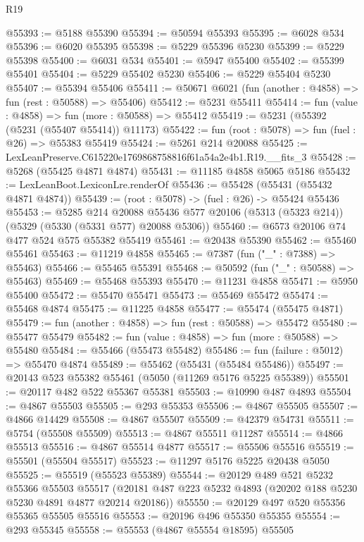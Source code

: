 \begin{lexlean}{R19}
\begin{coremodule}
@55393 := @5188 @55390
@55394 := @50594 @55393
@55395 := @6028 @534
@55396 := @6020 @55395
@55398 := @5229 @55396 @5230
@55399 := @5229 @55398
@55400 := @6031 @534
@55401 := @5947 @55400
@55402 := @55399 @55401
@55404 := @5229 @55402 @5230
@55406 := @5229 @55404 @5230
@55407 := @55394 @55406
@55411 := @50671 @6021 (fun (another : @4858) => fun (rest : @50588) => @55406)
@55412 := @5231 @55411
@55414 := fun (value : @4858) => fun (more : @50588) => @55412
@55419 := @5231 (@55392 (@5231 (@55407 @55414)) @11173)
@55422 := fun (root : @5078) => fun (fuel : @26) => @55383 @55419
@55424 := @5261 @214 @20088
@55425 := LexLeanPreserve.C615220e1769868758816f61a54a2e4b1.R19.__fits_3
@55428 := @5268 (@55425 @4871 @4874)
@55431 := @11185 @4858 @5065 @5186
@55432 := LexLeanBoot.LexiconLre.renderOf
@55436 := @55428 (@55431 (@55432 @4871 @4874))
@55439 := (root : @5078) -> (fuel : @26) -> @55424 @55436
@55453 := @5285
    @214
    @20088
    @55436
    @577
    @20106
    (@5313 (@5323 @214))
    (@5329 (@5330 (@5331 @577) @20088 @5306))
@55460 := @6573 @20106 @74 @477 @524 @575 @55382 @55419
@55461 := @20438 @55390
@55462 := @55460 @55461
@55463 := @11219 @4858
@55465 := @7387 (fun ("_" : @7388) => @55463)
@55466 := @55465 @55391
@55468 := @50592 (fun ("_" : @50588) => @55463)
@55469 := @55468 @55393
@55470 := @11231 @4858
@55471 := @5950 @55400
@55472 := @55470 @55471
@55473 := @55469 @55472
@55474 := @55468 @4874
@55475 := @11225 @4858
@55477 := @55474 (@55475 @4871)
@55479 := fun (another : @4858) => fun (rest : @50588) => @55472
@55480 := @55477 @55479
@55482 := fun (value : @4858) => fun (more : @50588) => @55480
@55484 := @55466 (@55473 @55482)
@55486 := fun (failure : @5012) => @55470 @4874
@55489 := @55462 (@55431 (@55484 @55486))
@55497 := @20143 @523 @55382 @55461 (@5050 (@11269 @5176 @5225 @55389))
@55501 := @20117 @482 @522 @55367 @55381
@55503 := @10990 @487 @4893
@55504 := @4867 @55503
@55505 := @293 @55353
@55506 := @4867 @55505
@55507 := @4866 @14429
@55508 := @4867 @55507
@55509 := @42379 @54731
@55511 := @5754 (@55508 @55509)
@55513 := @4867 @55511 @11287
@55514 := @4866 @55513
@55516 := @4867 @55514 @4877
@55517 := @55506 @55516
@55519 := @55501 (@55504 @55517)
@55523 := @11297 @5176 @5225 @20438 @5050
@55525 := @55519 (@55523 @55389)
@55544 := @20129
    @489
    @521
    @5232
    @55366
    @55503
    @55517
    (@20181 @487 @223 @5232 @4893 (@20202 @188 @5230 @5230 @4891 @4877 @20214 @20186))
@55550 := @20129 @497 @520 @55356 @55365 @55505 @55516
@55553 := @20196 @496 @55350 @55355
@55554 := @293 @55345
@55558 := @55553 (@4867 @55554 @18595) @55505

\end{coremodule}
\end{lexlean}
